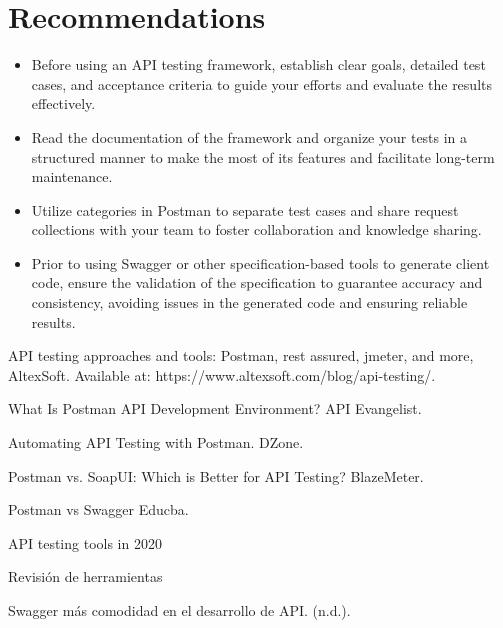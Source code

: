\documentclass[twoside,twocolumn]{article}
\begin{document}
\section{Recommendations}
\begin{itemize}	
	\item  Before using an API testing framework, establish clear goals, detailed test cases, and acceptance criteria to guide your efforts and evaluate the results effectively.
	\item Read the documentation of the framework and organize your tests in a structured manner to make the most of its features and facilitate long-term maintenance.
	\item Utilize categories in Postman to separate test cases and share request collections with your team to foster collaboration and knowledge sharing.
	\item Prior to using Swagger or other specification-based tools to generate client code, ensure the validation of the specification to guarantee accuracy and consistency, avoiding issues in the generated code and ensuring reliable results.
\end{itemize} 




\begin{thebibliography}{99} 

\bibitem[AltexSoft , 2020]{}
\newblock API testing approaches and tools: Postman, rest assured, jmeter, and more, AltexSoft. Available at: https://www.altexsoft.com/blog/api-testing/.

\bibitem[Lane, K. (2015)]{}
\newblock What Is Postman API Development Environment? API Evangelist. 

\bibitem[Gartner, D. (2018)]{}
\newblock  Automating API Testing with Postman. DZone. 

\bibitem[Gesualdo, R. (2021)]{}
\newblock Postman vs. SoapUI: Which is Better for API Testing? BlazeMeter.

\bibitem[Educba. (s.f.)]{}
\newblock Postman vs Swagger Educba. 


\bibitem[Aldaine, A. (2018)]{}
 API testing tools in 2020 

\newbloc Revisión de herramientas

\newbloc Swagger más comodidad en el desarrollo de API. (n.d.).
\end{thebibliography}


\end{document}
